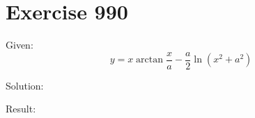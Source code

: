 \documentclass[a4paper, 10pt]{scrartcl}
\begin{document}
\section{Exercise 990}

Given:
\[
y = x\arctan{\frac{x}{a}} - \frac{a}{2}\ln{(x^{2} + a^{2})}
\]

Solution:

Result:
\end{document}

